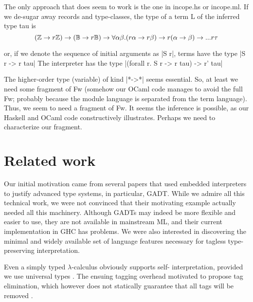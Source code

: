 The only approach that does seem to work
is the one in incope.hs or incope.ml. If we de-sugar away records and
type-classes, the type of a term L of the inferred type tau is
$$ 
  (\mathbb{Z} \rightarrow r \mathbb{Z}) \rightarrow
  (\mathbb{B} \rightarrow r \mathbb{B}) \rightarrow
  \forall \alpha \beta. (r \alpha \rightarrow r \beta)
      \rightarrow r (\alpha\rightarrow\beta) \rightarrow ... r \tau
$$

or, if we denote the sequence of initial arguments as |S r|, terms have
the type |S r -> r tau|
The interpreter has the type
|(forall r. S r -> r tau) -> r' tau|

The higher-order type (variable) of kind |*->*| seems essential. So, at
least we need some fragment of Fw (somehow our OCaml code manages to
avoid the full Fw; probably because the module language is separated
from the term language). Thus, we seem to need a fragment of Fw. It
seems the inference is possible, as our Haskell and OCaml code
constructively illustrates. Perhaps we need to characterize our
fragment.

\fi

\section{Related work}\label{related}

Our initial motivation came from several papers
\citep{WalidICFP02,taha-tag,xi-guarded,peyton-jones-simple} that used
embedded interpreters to justify advanced type systems, in particular,
GADT. While we admire all this technical work, we were not convinced
that their motivating example actually needed all this machinery.
Although GADTs may indeed be more flexible and easier to use, they are
not available in mainstream ML, and their current implementation in
GHC has problems. We were also interested in discovering the minimal and
widely available set of language features necessary for tagless
type-preserving interpretation.

Even a simply typed $\lambda$-calculus obviously supports self\hyp
interpretation, provided we use universal types \cite{taha-tag}.  The
ensuing tagging overhead motivated \cite{taha-tag} to propose tag
elimination, which however does not statically guarantee that all tags
will be removed \cite{WalidICFP02}.

